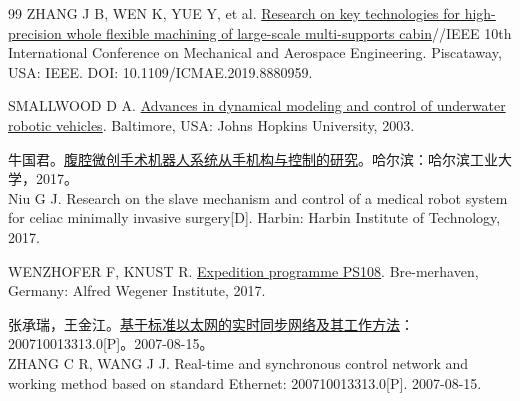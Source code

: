 \documentclass{JQRnew}
\begin{document}
\begin{thebibliography}{99}
 ZHANG J B, WEN K, YUE Y, et al. \href{http://doi.org/10.1109/ICMAE.2019.8880959}{Research on key technologies for high-precision whole flexible machining of large-scale multi-supports cabin}\allowbreak[C]//IEEE 10th International Conference on Mechanical and Aerospace Engineering. Piscataway, USA: IEEE. DOI: 10.1109/ICMAE.2019.8880959.


 SMALLWOOD D A. \href{https://dl.acm.org/doi/book/10.5555/937172}{Advances in dynamical modeling and control of underwater robotic vehicles}\allowbreak[D]. Baltimore, USA: Johns Hopkins University, 2003.

 牛国君。\href{http://cdmd.cnki.com.cn/Article/CDMD-10213-1017862151.htm}{腹腔微创手术机器人系统从手机构与控制的研究}\allowbreak[D]。哈尔滨：哈尔滨工业大学，2017。 \\
Niu G J. Research on the slave mechanism and control of a medical robot system for celiac minimally invasive surgery[D]. Harbin: Harbin Institute of Technology, 2017.


 WENZHOFER F, KNUST R. \href{https://epic.awi.de/id/eprint/44793/}{Expedition programme PS108}\allowbreak[R]. Bre-merhaven, Germany: Alfred Wegener Institute, 2017.


 张承瑞，王金江。\href{http://d.wanfangdata.com.cn/patent/CN200710013313.0}{基于标准以太网的实时同步网络及其工作方法}：200710013313.0[P]。2007-08-15。 \\
ZHANG C R, WANG J J. Real-time and synchronous control network and working method based on standard Ethernet: 200710013313.0[P]. 2007-08-15.



\end{thebibliography}
\end{document}
